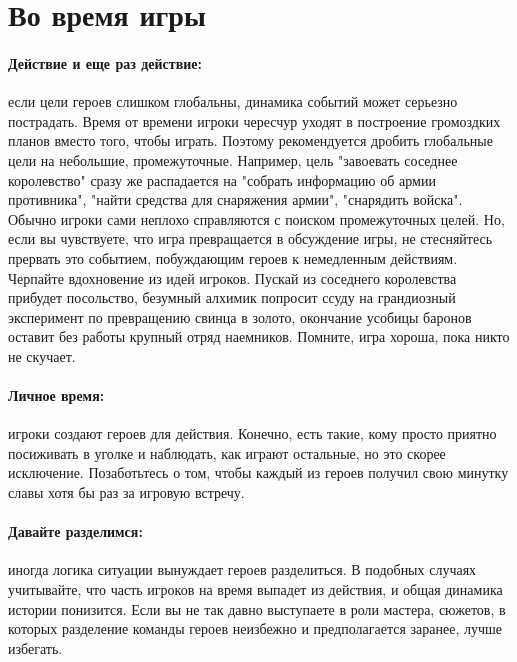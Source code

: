 \section{Во время игры}
\paragraph{Действие и еще раз действие:} если цели героев слишком глобальны, динамика событий может серьезно пострадать. Время от времени игроки чересчур уходят в построение громоздких планов вместо того, чтобы играть. Поэтому рекомендуется дробить глобальные цели на небольшие, промежуточные. Например, цель "завоевать соседнее королевство" сразу же распадается на "собрать информацию об армии противника", "найти средства для снаряжения армии", "снарядить войска". Обычно игроки сами неплохо справляются с поиском промежуточных целей. Но, если вы чувствуете, что игра превращается в обсуждение игры, не стесняйтесь прервать это событием, побуждающим героев к немедленным действиям. Черпайте вдохновение из идей игроков. Пускай из соседнего королевства прибудет посольство, безумный алхимик попросит ссуду на грандиозный эксперимент по превращению свинца в золото, окончание усобицы баронов оставит без работы крупный отряд наемников. Помните, игра хороша, пока никто не скучает.
\paragraph{Личное время:} игроки создают героев для действия. Конечно, есть такие, кому просто приятно посиживать в уголке и наблюдать, как играют остальные, но это скорее исключение. Позаботьтесь о том, чтобы каждый из героев получил свою минутку славы хотя бы раз за игровую встречу.
\paragraph{Давайте разделимся:} иногда логика ситуации вынуждает героев разделиться. В подобных случаях учитывайте, что часть игроков на время выпадет из действия, и общая динамика истории понизится. Если вы не так давно выступаете в роли мастера, сюжетов, в которых разделение команды героев неизбежно и предполагается заранее, лучше избегать.
